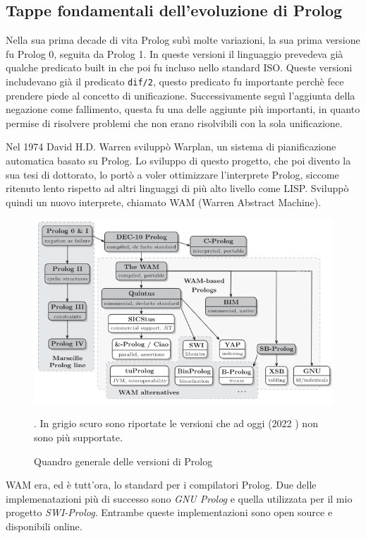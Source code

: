 \subsection{Tappe fondamentali dell'evoluzione di Prolog}
\label{subsec:tappe}
Nella sua prima decade di vita Prolog subì molte variazioni, la sua prima versione fu Prolog 0, seguita da Prolog 1. In queste versioni il linguaggio
prevedeva già qualche predicato built in che poi fu incluso nello standard ISO. Queste versioni includevano già il predicato \verb+dif/2+, questo predicato fu importante perchè fece prendere piede al concetto di unificazione. Successivamente seguì l'aggiunta
della negazione come fallimento, questa fu una delle aggiunte più importanti, in quanto permise di risolvere problemi che non erano risolvibili con la sola unificazione.

Nel 1974 David H.D. Warren sviluppò Warplan, un sistema di pianificazione automatica basato su Prolog. Lo sviluppo di questo progetto, che poi divento la sua tesi di dottorato, lo portò a voler ottimizzare l'interprete Prolog, siccome ritenuto lento rispetto ad altri linguaggi di più alto livello come LISP.
Sviluppò quindi un nuovo interprete, chiamato WAM (Warren Abstract Machine).

\begin{figure}[h!]
    \centering
    \includegraphics[scale=0.55]{images/prologimpl.png}
    \caption{Quandro generale delle versioni di Prolog \cite{korner2022fifty}}. In grigio scuro sono riportate le versioni che ad oggi (2022 \cite{korner2022fifty}) non sono più supportate.
    \label{fig:prologimpl}
\end{figure}

WAM era, ed è tutt'ora, lo standard per i compilatori Prolog. Due delle implemenatazioni più di successo 
sono \textit{GNU Prolog} e quella utilizzata per il mio progetto \textit{SWI-Prolog}. Entrambe queste implementazioni sono open source e disponibili online.

